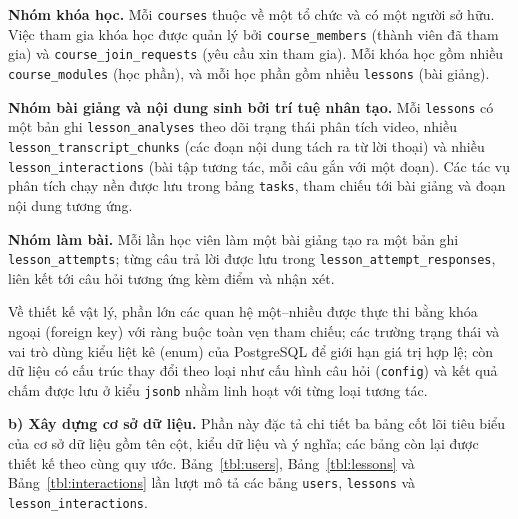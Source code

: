 \documentclass[../DoAn.tex]{subfiles}
\begin{document}
\textbf{Nhóm khóa học.} Mỗi \texttt{courses} thuộc về một tổ chức và có một người sở hữu. Việc tham gia khóa học được quản lý bởi \texttt{course\_members} (thành viên đã tham gia) và \texttt{course\_join\_requests} (yêu cầu xin tham gia). Mỗi khóa học gồm nhiều \texttt{course\_modules} (học phần), và mỗi học phần gồm nhiều \texttt{lessons} (bài giảng).

\textbf{Nhóm bài giảng và nội dung sinh bởi trí tuệ nhân tạo.} Mỗi \texttt{lessons} có một bản ghi \texttt{lesson\_analyses} theo dõi trạng thái phân tích video, nhiều \texttt{lesson\_transcript\_chunks} (các đoạn nội dung tách ra từ lời thoại) và nhiều \texttt{lesson\_interactions} (bài tập tương tác, mỗi câu gắn với một đoạn). Các tác vụ phân tích chạy nền được lưu trong bảng \texttt{tasks}, tham chiếu tới bài giảng và đoạn nội dung tương ứng.

\textbf{Nhóm làm bài.} Mỗi lần học viên làm một bài giảng tạo ra một bản ghi \texttt{lesson\_attempts}; từng câu trả lời được lưu trong \texttt{lesson\_attempt\_responses}, liên kết tới câu hỏi tương ứng kèm điểm và nhận xét.

Về thiết kế vật lý, phần lớn các quan hệ một--nhiều được thực thi bằng khóa ngoại (foreign key) với ràng buộc toàn vẹn tham chiếu; các trường trạng thái và vai trò dùng kiểu liệt kê (enum) của PostgreSQL để giới hạn giá trị hợp lệ; còn dữ liệu có cấu trúc thay đổi theo loại như cấu hình câu hỏi (\texttt{config}) và kết quả chấm được lưu ở kiểu \texttt{jsonb} nhằm linh hoạt với từng loại tương tác.

\textbf{b) Xây dựng cơ sở dữ liệu.} Phần này đặc tả chi tiết ba bảng cốt lõi tiêu biểu của cơ sở dữ liệu gồm tên cột, kiểu dữ liệu và ý nghĩa; các bảng còn lại được thiết kế theo cùng quy ước. Bảng~\ref{tbl:users}, Bảng~\ref{tbl:lessons} và Bảng~\ref{tbl:interactions} lần lượt mô tả các bảng \texttt{users}, \texttt{lessons} và \texttt{lesson\_interactions}.
\end{document}
